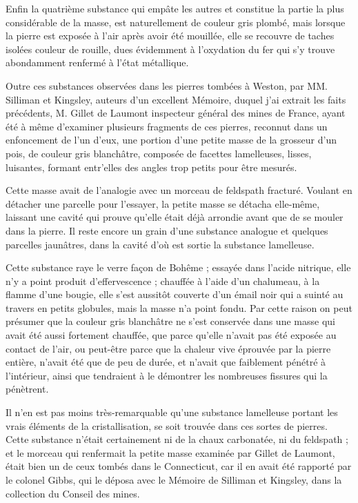 \documentclass[a4paper, 12pt, oneside, french]{article}
\begin{document}
Enfin la quatrième substance qui empâte les autres et constitue la partie la plus considérable de la masse, est naturellement de couleur gris plombé, mais lorsque la pierre est exposée à l'air après avoir été mouillée, elle se recouvre de taches isolées couleur de rouille, dues évidemment à l'oxydation du fer qui s'y trouve abondamment renfermé à l'état métallique.

Outre ces substances observées dans les pierres tombées à Weston, par MM. Silliman et Kingsley, auteurs d'un excellent Mémoire, duquel j'ai extrait les faits précédents, M. Gillet de Laumont inspecteur général des mines de France, ayant été à même d'examiner plusieurs fragments de ces pierres, reconnut dans un enfoncement de l'un d'eux, une portion d'une petite masse de la grosseur d'un pois, de couleur gris blanchâtre, composée de facettes lamelleuses, lisses, luisantes, formant entr'elles des angles trop petits pour être mesurés.

Cette masse avait de l'analogie avec un morceau de feldspath fracturé. Voulant en détacher une parcelle pour l'essayer, la petite masse se détacha elle-même, laissant une cavité qui prouve qu'elle était déjà arrondie avant que de se mouler dans la pierre. Il reste encore un grain d'une substance analogue et quelques parcelles jaunâtres, dans la cavité d'où est sortie la substance lamelleuse.

Cette substance raye le verre façon de Bohême ; essayée dans l'acide nitrique, elle n'y a point produit d'effervescence ; chauffée à l'aide d'un chalumeau, à la flamme d'une bougie, elle s'est aussitôt couverte d'un émail noir qui a suinté au travers en petits globules, mais la masse n'a point fondu. Par cette raison on peut présumer que la couleur gris blanchâtre ne s'est conservée dans une masse qui avait été aussi fortement chauffée, que parce qu'elle n'avait pas été exposée au contact de l'air, ou peut-être parce que la chaleur vive éprouvée par la pierre entière, n'avait été que de peu de durée, et n'avait que faiblement pénétré à l'intérieur, ainsi que tendraient à le démontrer les nombreuses fissures qui la pénètrent.

Il n'en est pas moins très-remarquable qu'une substance lamelleuse portant les vrais éléments de la cristallisation, se soit trouvée dans ces sortes de pierres. Cette substance n'était certainement ni de la chaux carbonatée, ni du feldspath ; et le morceau qui renfermait la petite masse examinée par Gillet de Laumont, était bien un de ceux tombés dans le Connecticut, car il en avait été rapporté par le colonel Gibbs, qui le déposa avec le Mémoire de Silliman et Kingsley, dans la collection du Conseil des mines.
\end{document}
